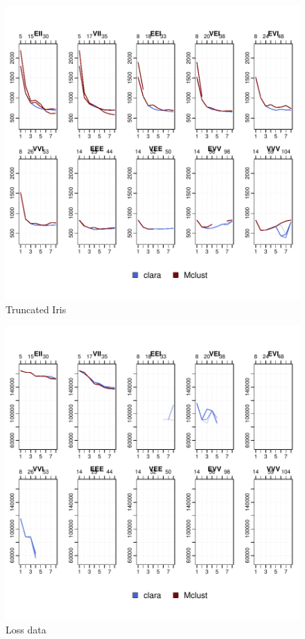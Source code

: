 \begin{figure}[h!]
    \begin{Rgraph}[0.9]
\includegraphics{chapter3-figtriris}
    \caption{Truncated Iris}
    \label{fig:triris}
    \end{Rgraph}
\end{figure}

\begin{figure}[h!]
    \begin{Rgraph}[0.9]
\includegraphics{chapter3-figloss}
    \caption{Loss data}
    \label{fig:loss}
    \end{Rgraph}
\end{figure}
